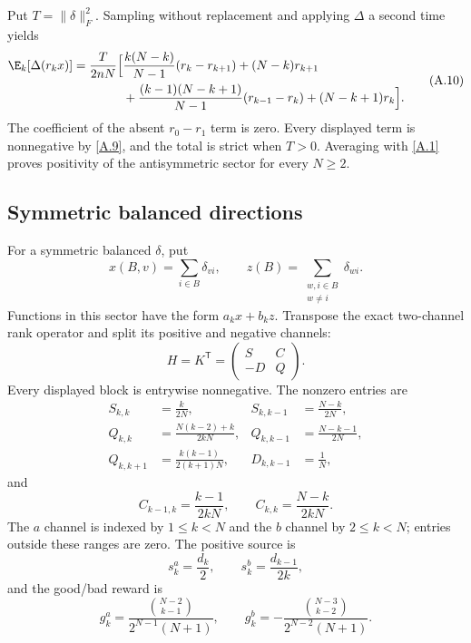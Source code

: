 Put $T=\|\delta\|_F^2$.  Sampling without replacement and applying
$\Delta$ a second time yields
\[
\begin{aligned}
 \E_k[\Delta(r_kx)]={\frac{T}{2nN}}\Big[&
 {\frac{k(N-k)}{ N-1}}(r_k-r_{k+1})+(N-k)r_{k+1}\\
 &+{\frac{(k-1)(N-k+1)}{ N-1}}(r_{k-1}-r_k)
 +(N-k+1)r_k\Big].
\end{aligned}                                               \tag{A.10}\label{A.10}
\]
The coefficient of the absent $r_0-r_1$ term is zero.  Every displayed term
is nonnegative by \eqref{A.9}, and the total is strict when $T>0$.
Averaging with \eqref{A.1} proves positivity of the antisymmetric sector for
every $N\ge2$.

\subsection{Symmetric balanced directions}

For a symmetric balanced $\delta$, put
\[
 x(B,v)=\sum_{i\in B}\delta_{vi},\qquad
 z(B)=\sum_{\substack{w,i\in B\\w\ne i}}\delta_{wi}.       \tag{A.11}\label{A.11}
\]
Functions in this sector have the form $a_kx+b_kz$.  Transpose the exact
two-channel rank operator and split its positive and negative channels:
\[
 H=K^{\mathsf T}=\begin{pmatrix}S&C\\-D&Q\end{pmatrix}.     \tag{A.12}\label{A.12}
\]
Every displayed block is entrywise nonnegative.  The nonzero entries are
\[
\begin{aligned}
 S_{k,k}&={\frac{k}{2N}},&S_{k,k-1}&={\frac{N-k}{2N}},\\
 Q_{k,k}&={\frac{N(k-2)+k}{2kN}},
 &Q_{k,k-1}&={\frac{N-k-1}{2N}},\\
 Q_{k,k+1}&={\frac{k(k-1)}{2(k+1)N}},
 &D_{k,k-1}&={\frac{1}{ N}},
\end{aligned}                                               \tag{A.13}\label{A.13}
\]
and
\[
 C_{k-1,k}={\frac{k-1}{2kN}},\qquad C_{k,k}={\frac{N-k}{2kN}}.      \tag{A.14}\label{A.14}
\]
The $a$ channel is indexed by $1\le k<N$ and the $b$ channel by
$2\le k<N$; entries outside these ranges are zero.  The positive source is
\[
 s_k^a={\frac{d_k}{2}},\qquad s_k^b={\frac{d_{k-1}}{2k}},            \tag{A.15}\label{A.15}
\]
and the good/bad reward is
\[
 g_k^a={\frac{\binom{N-2}{k-1}}{2^{N-1}(N+1)}},\qquad
 g_k^b=-{\frac{\binom{N-3}{k-2}}{2^{N-2}(N+1)}}.                \tag{A.16}\label{A.16}
\]

